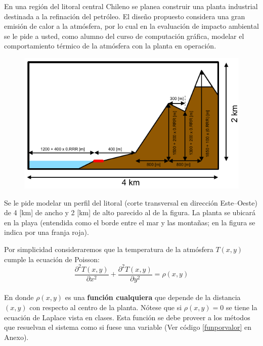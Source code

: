 \documentclass[letterpaper,11pt]{article} %
\begin{document}




En una región del litoral central Chileno se planea construir una planta
industrial destinada a la refinación del petróleo. El diseño propuesto
considera una gran emisión de calor a la atmósfera, por lo cual en la
evaluación de impacto ambiental se le pide a usted, como alumno del curso de computación gráfica, modelar el comportamiento térmico de la atmósfera con la planta en operación. \\

\begin{figure}
	\includegraphics[width=\textwidth]{perfil.pdf}
\end{figure}

\par Se le pide modelar un perfil del litoral (corte transversal en dirección
Este--Oeste) de 4 [km] de ancho y 2 [km] de alto parecido al de la figura. La
planta se ubicará en la playa (entendida como el borde entre el mar y las
montañas; en la figura se indica por una franja roja).

Por simplicidad consideraremos que la temperatura de la atmósfera $T(x,y)$ cumple la
ecuación de Poisson:
$$
\frac{\partial^2 T(x, y)}{\partial x^2} +
\frac{\partial^2 T(x, y)}{\partial y^2} = \rho(x,y)
$$
\\
En donde $\rho(x,y)$ es una \textbf{función cualquiera} que depende de la distancia $(x,y)$ con respecto al centro de la planta. Nótese que si $\rho(x,y)=0$ se tiene la ecuación de Laplace vista en clases. Esta función se debe proveer a los métodos que resuelvan el sistema como si fuese una variable (Ver código \ref{funporvalor} en Anexo).
\end{document}
